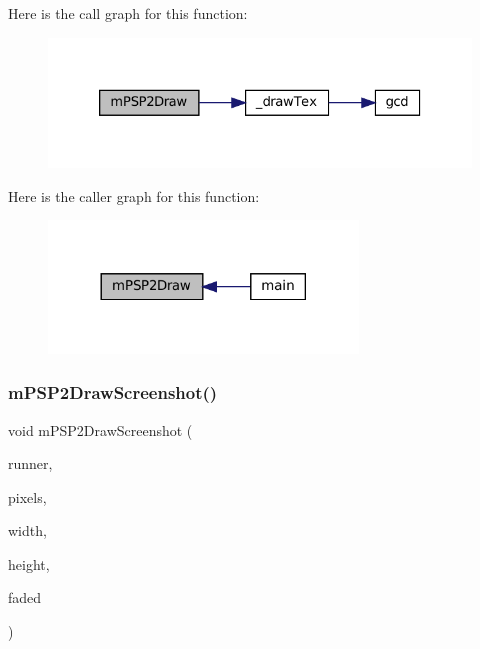 Here is the call graph for this function\+:
\nopagebreak
\begin{figure}[H]
\begin{center}
\leavevmode
\includegraphics[width=326pt]{psp2-context_8c_ac47f4c33aec2cd84a2236b2686d1ffbe_cgraph}
\end{center}
\end{figure}
Here is the caller graph for this function\+:
\nopagebreak
\begin{figure}[H]
\begin{center}
\leavevmode
\includegraphics[width=233pt]{psp2-context_8c_ac47f4c33aec2cd84a2236b2686d1ffbe_icgraph}
\end{center}
\end{figure}
\mbox{\label{psp2-context_8c_aa75d847f3a6026f830eac71a87e59a3d}} 
\subsubsection{\texorpdfstring{m\+P\+S\+P2\+Draw\+Screenshot()}{mPSP2DrawScreenshot()}}
{\footnotesize\ttfamily void m\+P\+S\+P2\+Draw\+Screenshot (\begin{DoxyParamCaption}\item[{struct \mbox{\hyperlink{structm_g_u_i_runner}{m\+G\+U\+I\+Runner}} $\ast$}]{runner,  }\item[{const uint32\+\_\+t $\ast$}]{pixels,  }\item[{unsigned}]{width,  }\item[{unsigned}]{height,  }\item[{\mbox{\hyperlink{libretro_8h_a4a26dcae73fb7e1528214a068aca317e}{bool}}}]{faded }\end{DoxyParamCaption})}

